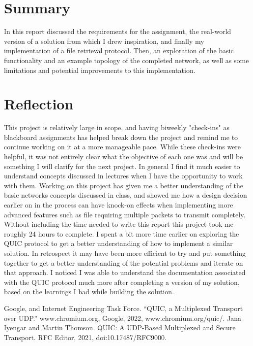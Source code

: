\documentclass{article}
\begin{document}
\section{Summary}
In this report discussed the requirements for the assignment, the real-world version of a solution from which I drew inspiration, and finally my implementation of a file retrieval protocol. Then, an exploration of the basic functionality and an example topology of the completed network, as well as some limitations and potential improvements to this implementation.

\section{Reflection}
This project is relatively large in scope, and having biweekly "check-ins" as blackboard assignments has helped break down the project and remind me to continue working on it at a more manageable pace. While these check-ins were helpful, it was not entirely clear what the objective of each one was and will be something I will clarify for the next project. In general I find it much easier to understand concepts discussed in lectures when I have the opportunity to work with them. Working on this project has given me a better understanding of the basic networks concepts discussed in class, and showed me how a design decision earlier on in the process can have knock-on effects when implementing more advanced features such as file requiring multiple packets to transmit completely. Without including the time needed to write this report this project took me roughly 24 hours to complete. I spent a bit more time earlier on exploring the QUIC protocol to get a better understanding of how to implement a similar solution. In retrospect it may have been more efficient to try and put something together to get a better understanding of the potential problems and iterate on that approach. I noticed I was able to understand the documentation associated with the QUIC protocol much more after completing a version of my solution, based on the learnings I had while building the solution.

\begin{thebibliography}{1}
	 Google, and Internet Engineering Task Force. “QUIC, a Multiplexed Transport over UDP.” www.chromium.org, Google, 2022, www.chromium.org/quic/.
	 Jana Iyengar and Martin Thomson. QUIC: A UDP-Based Multiplexed and Secure Transport. RFC Editor, 2021, doi:10.17487/RFC9000.
\end{thebibliography}
\end{document}
